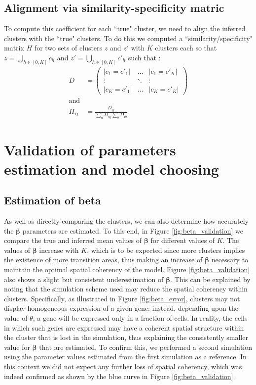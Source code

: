 	\subsection{Alignment via similarity-specificity matric}
To compute this coefficient for each ``true" cluster, we need to align the inferred clusters with the ``true" clusters. To do this we computed a ``similarity/specificity" matrix $H$ for two sets of clusters $z$ and $z'$ with $K$ clusters each so that $z = \bigcup_{h \in [0,K]} c_h $ and $z' = \bigcup_{h \in [0,K]} c'_h$ such that :
\begin{align*}
D &= \left( \begin{array} {ccc}
|c_1 = c'_1| & \ldots  & |c_1 = c'_K|\\
\vdots & \ddots & \vdots\\
|c_K = c'_1| & \ldots & |c_K = c'_K| \end{array} \right)\\
\text{and}\\
H_{ij} &= \frac{D_{ij}}{\sum_{a} D_{aj} \sum_{b} D_{ib}} 
\end{align*}




\section{Validation of parameters estimation and model choosing}

	\subsection{Estimation of beta}\label{subsec:beta_estimation}
	As well as directly comparing the clusters, we can also determine how accurately the $\mathbf{\beta}$ parameters are estimated. To this end, in Figure \ref{fig:beta_validation} we compare the true and inferred mean values of $\mathbf{\beta}$ for different values of $K$. The values of $\mathbf{\beta}$ increase with $K$, which is to be expected since more clusters implies the existence of more transition areas, thus making an increase of $\mathbf{\beta}$ necessary to maintain the optimal spatial coherency of the model. Figure \ref{fig:beta_validation} also shows a slight but consistent underestimation of $\mathbf{\beta}$. This can be explained by noting that the simulation scheme used may reduce the spatial coherency within clusters. Specifically, as illustrated in Figure \ref{fig:beta_error}, clusters may not display homogeneous expression of a given gene: instead, depending upon the value of $\theta$, a gene will be expressed only in a fraction of cells. In reality, the cells in which such genes are expressed may have a coherent spatial structure within the cluster that is lost in the simulation, thus explaining the consistently smaller value for $\mathbf{\beta}$ that are estimated. To confirm this, we performed a second simulation using the parameter values estimated from the first simulation as a reference. In this context we did not expect any further loss of spatial coherency, which was indeed confirmed as shown by the blue curve in Figure \ref{fig:beta_validation}.\\
	
